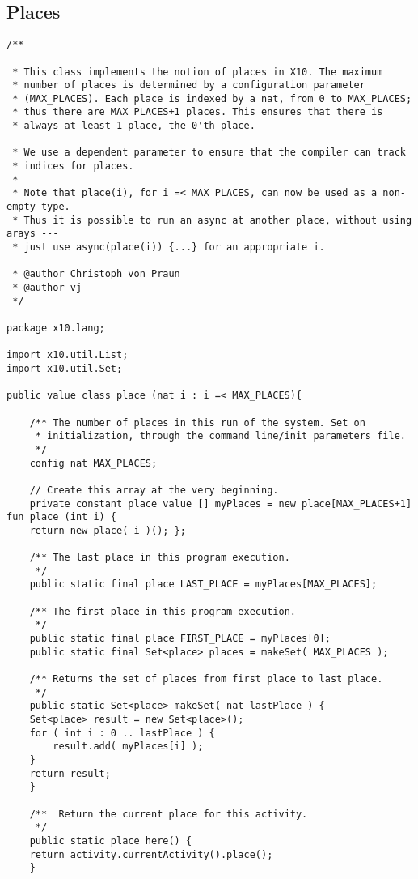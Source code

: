 \documentclass{article}
\begin{document}
\subsection{Places}
{\footnotesize
\begin{verbatim}
/**

 * This class implements the notion of places in X10. The maximum
 * number of places is determined by a configuration parameter
 * (MAX_PLACES). Each place is indexed by a nat, from 0 to MAX_PLACES;
 * thus there are MAX_PLACES+1 places. This ensures that there is
 * always at least 1 place, the 0'th place.

 * We use a dependent parameter to ensure that the compiler can track
 * indices for places.
 * 
 * Note that place(i), for i =< MAX_PLACES, can now be used as a non-empty type.
 * Thus it is possible to run an async at another place, without using arays ---
 * just use async(place(i)) {...} for an appropriate i.

 * @author Christoph von Praun
 * @author vj
 */
 
package x10.lang;

import x10.util.List;
import x10.util.Set;

public value class place (nat i : i =< MAX_PLACES){

    /** The number of places in this run of the system. Set on
     * initialization, through the command line/init parameters file.
     */
    config nat MAX_PLACES;

    // Create this array at the very beginning.
    private constant place value [] myPlaces = new place[MAX_PLACES+1] fun place (int i) { 
	return new place( i )(); };

    /** The last place in this program execution.
     */
    public static final place LAST_PLACE = myPlaces[MAX_PLACES];

    /** The first place in this program execution.
     */
    public static final place FIRST_PLACE = myPlaces[0];
    public static final Set<place> places = makeSet( MAX_PLACES );	

    /** Returns the set of places from first place to last place.
     */
    public static Set<place> makeSet( nat lastPlace ) {
	Set<place> result = new Set<place>();
	for ( int i : 0 .. lastPlace ) {
	    result.add( myPlaces[i] );
	}
	return result;
    }

    /**  Return the current place for this activity.
     */
    public static place here() {
	return activity.currentActivity().place();
    }


\end{verbatim}}
\end{document}
